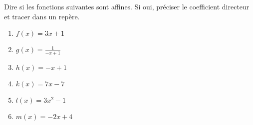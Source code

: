 
\begin{exercice}\label{exosmath-0637}

    Dire si les fonctions suivantes sont affines. Si oui, préciser le coefficient directeur et tracer dans un repère.
    \begin{multicols}{2}
        \begin{enumerate}
            \item
                \( f(x)=3x+1\)
            \item
                \( g(x)=\frac{1}{ -x+1 }\)
            \item
                \( h(x)=-x+1\)
            \item
                \( k(x)=7x-7\)
            \item
                \( l(x)=3x^2-1\)
            \item
                \( m(x)=-2x+4\)
        \end{enumerate}
    \end{multicols}

\end{exercice}
